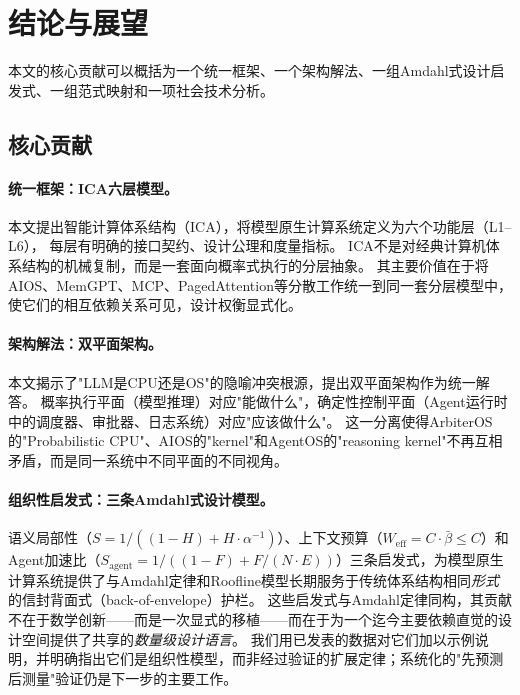 \section{结论与展望}
\label{sec:conclusion}

本文的核心贡献可以概括为一个统一框架、一个架构解法、一组Amdahl式设计启发式、一组范式映射和一项社会技术分析。

\subsection{核心贡献}

\paragraph{统一框架：ICA六层模型。}
本文提出智能计算体系结构（ICA），将模型原生计算系统定义为六个功能层（L1--L6），
每层有明确的接口契约、设计公理和度量指标。
ICA不是对经典计算机体系结构的机械复制，而是一套面向概率式执行的分层抽象。
其主要价值在于将AIOS\cite{mei2024aios}、MemGPT\cite{memgpt2023}、MCP\cite{mcp_intro_2026}、PagedAttention\cite{kwon2023pagedattention}等分散工作统一到同一套分层模型中，使它们的相互依赖关系可见，设计权衡显式化。

\paragraph{架构解法：双平面架构。}
本文揭示了"LLM是CPU还是OS"的隐喻冲突根源，提出双平面架构作为统一解答。
概率执行平面（模型推理）对应"能做什么"，确定性控制平面（Agent运行时中的调度器、审批器、日志系统）对应"应该做什么"。
这一分离使得ArbiterOS的"Probabilistic CPU"\cite{arbiteros2025}、AIOS的"kernel"\cite{mei2024aios}和AgentOS的"reasoning kernel"\cite{agentos2025}不再互相矛盾，而是同一系统中不同平面的不同视角。

\paragraph{组织性启发式：三条Amdahl式设计模型。}
语义局部性（$S = 1/((1-H)+H\cdot\alpha^{-1})$）、上下文预算（$W_{\mathrm{eff}} = C \cdot \bar{\beta} \leq C$）和Agent加速比（$S_{\mathrm{agent}} = 1/((1-F)+F/(N\cdot E))$）三条启发式，为模型原生计算系统提供了与Amdahl定律和Roofline模型长期服务于传统体系结构相同\emph{形式}的信封背面式（back-of-envelope）护栏。
这些启发式与Amdahl定律同构，其贡献不在于数学创新——而是一次显式的移植——而在于为一个迄今主要依赖直觉的设计空间提供了共享的\emph{数量级设计语言}。
我们用已发表的数据对它们加以示例说明，并明确指出它们是组织性模型，而非经过验证的扩展定律；系统化的"先预测后测量"验证仍是下一步的主要工作。

